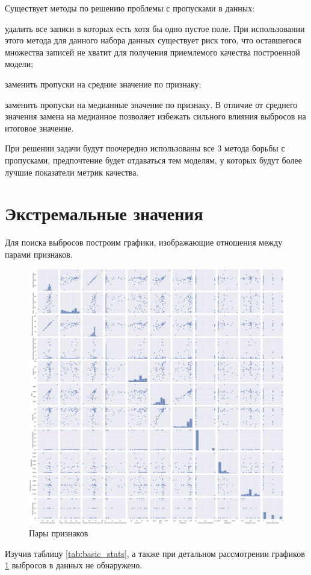 Существует методы по решению проблемы с пропусками в данных:
\begin{description}[font=$\bullet$]
    \item удалить все записи в которых есть хотя бы одно пустое поле. При использовании этого метода для данного набора данных существует риск того, что оставшегося множества записей не хватит для получения приемлемого качества построенной модели;
    \item заменить пропуски на средние значение по признаку;
    \item заменить пропуски на медианные значение по признаку. В отличие от среднего значения замена на медианное позволяет избежать сильного влияния выбросов на итоговое значение.
\end{description}
При решении задачи будут поочередно использованы все 3 метода борьбы с пропусками, предпочтение будет отдаваться тем моделям, у которых будут более лучшие показатели метрик качества.

\section{Экстремальные значения}

Для поиска выбросов построим графики, изображающие отношения между парами признаков.\\

\begin{figure}[h]
\begin{center}
\includegraphics[width=0.9\linewidth]{src/img/pair_plot.png}
\caption{Пары признаков}
\label{fig:pair_plot}
\end{center}
\end{figure}

Изучив таблицу \ref{tab:basic_stats}, а также при детальном рассмотрении графиков \ref{fig:pair_plot} выбросов в данных не обнаружено.

